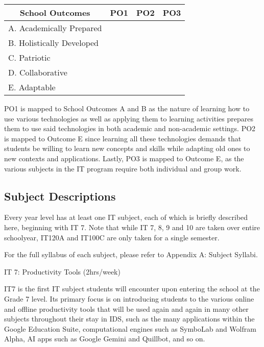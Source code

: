 \begin{table}[H]
\renewcommand{\arraystretch}{1}
\begin{center}
\begin{tabularx}{9cm}{X c c c}
	\multicolumn{1}{c}{\textbf{School Outcomes}} & \textbf{PO1} 	& \textbf{PO2} & \textbf{PO3}	\\
	\toprule
	A. Academically Prepared	& \checkmark	&		&		\\

	B. Holistically Developed	& \checkmark	&	 &			\\

	C. Patriotic 				& 				&				&					\\

	D. Collaborative			& 				&				& \checkmark\\

	E. Adaptable				&				& \checkmark		&\\
	\bottomrule
\end{tabularx}
\end{center}
\end{table}
PO1 is mapped to School Outcomes A and B as the nature of learning how to use various technologies as well as applying them to learning activities prepares them to use said technologies in both academic and non-academic settings. PO2 is mapped to Outcome E since learning all these technologies demands that students be willing to learn new concepts and skills while adapting old ones to new contexts and applications. Lastly, PO3 is mapped to Outcome E, as the various subjects in the IT program require both individual and group work.

\subsection{Subject Descriptions}
Every year level has at least one IT subject, each of which is briefly described here, beginning with IT 7. Note that while IT 7, 8, 9 and 10 are taken over entire schoolyear, IT120A and IT100C are only taken for a single semester. 

For the full syllabus of each subject, please refer to Appendix A: Subject Syllabi.

\begin{subject}
IT 7: Productivity Tools
\hfill
(2hrs/week)
\end{subject}
IT7 is the first IT subject students will encounter upon entering the school at the Grade 7 level. Its primary focus is on introducing students to the various online and offline productivity tools that will be used again and again in many other subjects throughout their stay in IDS, such as the many applications within the Google Education Suite, computational engines such as SymboLab and Wolfram Alpha, AI apps such as Google Gemini and Quillbot, and so on. 

